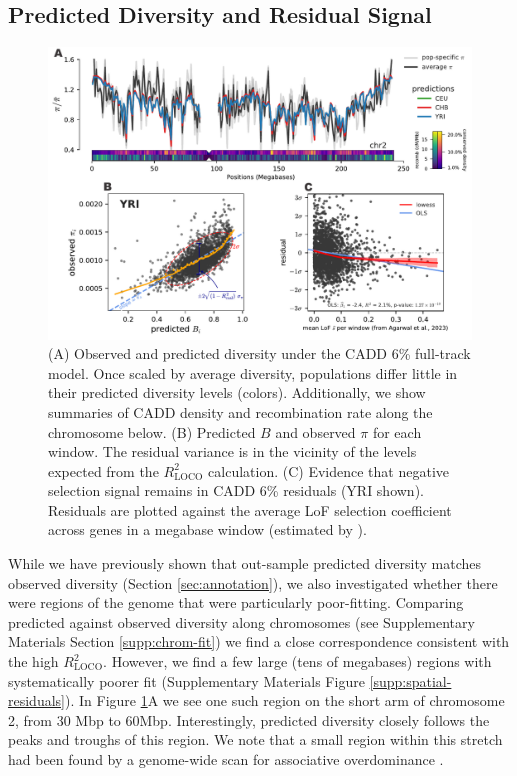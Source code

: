 \documentclass[11pt]{article}
\begin{document}
\subsection*{Predicted Diversity and Residual Signal}

\begin{figure}[htbp] \centering
    \includegraphics[width=\textwidth]{figures/figure_6.pdf} 

    \caption{(A) Observed and predicted diversity under the CADD 6\% full-track
        model. Once scaled by average diversity, populations differ little in
        their predicted diversity levels (colors). Additionally, we show
        summaries of CADD density and recombination rate along the chromosome
        below. (B) Predicted $B$ and observed $\pi$ for each window. The
        residual variance is in the vicinity of the levels expected from the
        $R_\text{LOCO}^2$ calculation. (C) Evidence that negative selection
    signal remains in CADD 6\% residuals (YRI shown). Residuals are plotted
against the average LoF selection coefficient across genes in a megabase window
(estimated by \cite{Agarwal2023-un}).}

  \label{fig:figure-5}
\end{figure}

While we have previously shown that out-sample predicted diversity matches
observed diversity (Section \ref{sec:annotation}), we also investigated whether
there were regions of the genome that were particularly poor-fitting. Comparing
predicted against observed diversity along chromosomes (see Supplementary
Materials Section \ref{supp:chrom-fit}) we find a close correspondence
consistent with the high $R_\text{LOCO}^2$. However, we find a few large (tens
of megabases) regions with systematically poorer fit (Supplementary Materials
Figure \ref{supp:spatial-residuals}). In Figure \ref{fig:figure-5}A we see one
such region on the short arm of chromosome 2, from 30 Mbp to 60Mbp.
Interestingly, predicted diversity closely follows the peaks and troughs of
this region. We note that a small region within this stretch had been found by
a genome-wide scan for associative overdominance \parencite{Gilbert2020-aw}.  
\end{document}
